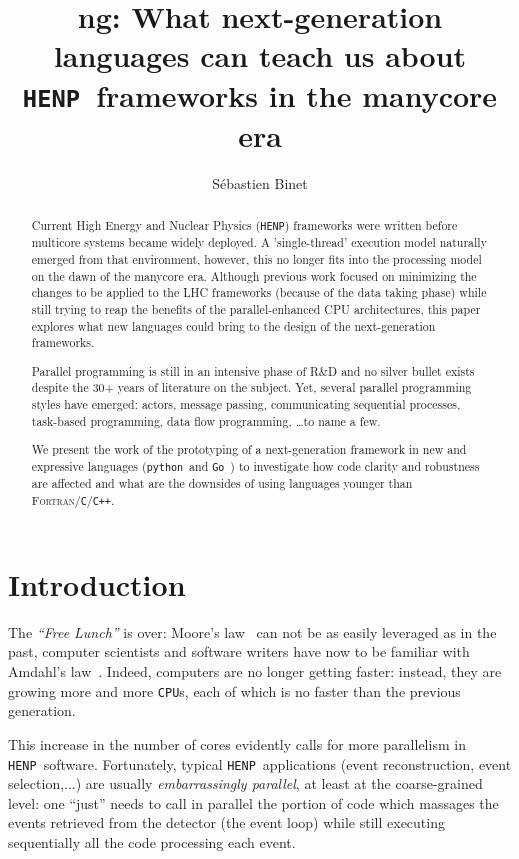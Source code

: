 \documentclass[a4paper]{jpconf}
\newcommand{\python}{\texttt{python}}
\newcommand{\golang}{\texttt{Go}}
\newcommand{\henp}{\texttt{HENP}}
\begin{document}
\title{ng: What next-generation languages can teach us about
  \henp\ frameworks in the manycore era}

\author{S\'ebastien Binet}

\address{Laboratoire de l'Acc\'el\'erateur Lin\'eaire, Universit\'e
  Paris-Sud XI, 91898, Orsay, FR}


\begin{abstract}

Current High Energy and Nuclear Physics (\henp ) frameworks were
written before multicore systems became widely deployed.
A 'single-thread' execution model naturally emerged from that
environment, however, this no longer fits into the processing model on
the dawn of the manycore era.
Although previous work focused on minimizing the changes to be applied
to the LHC frameworks (because of the data taking phase) while still
trying to reap the benefits of the parallel-enhanced CPU
architectures, this paper explores what new languages could bring to
the design of the next-generation frameworks.

Parallel programming is still in an intensive phase of R\&D and no
silver bullet exists despite the 30+ years of literature on the
subject.
Yet, several parallel programming styles have emerged: actors, message
passing, communicating sequential processes, task-based programming,
data flow programming, \ldots to name a few.

We present the work of the prototyping of a next-generation framework
in new and expressive languages (\python\ and \golang\ ) to
investigate how code clarity and robustness are affected and what are
the downsides of using languages younger than
\textsc{Fortran}/\texttt{C}/\texttt{C++}.
\end{abstract}

\section{Introduction}

The \emph{``Free Lunch''} is over: Moore's law~\cite{ref-moore} can
not be as easily leveraged as in the past, computer scientists and
software writers have now to be familiar with Amdahl's
law~\cite{ref-amdahl}.
Indeed, computers are no longer getting faster: instead, they are
growing more and more {\tt CPU}s, each of which is no faster than the
previous generation. 

This increase in the number of cores evidently calls for more parallelism in \henp\ software.
Fortunately, typical \henp\ applications (event reconstruction,
event selection,...) are usually \emph{embarrassingly parallel}, at
least at the coarse-grained level: one ``just'' needs to call in parallel
the portion of code which massages the events retrieved from the
detector (the event loop) while still executing sequentially all the
code processing each event.
\end{document}
